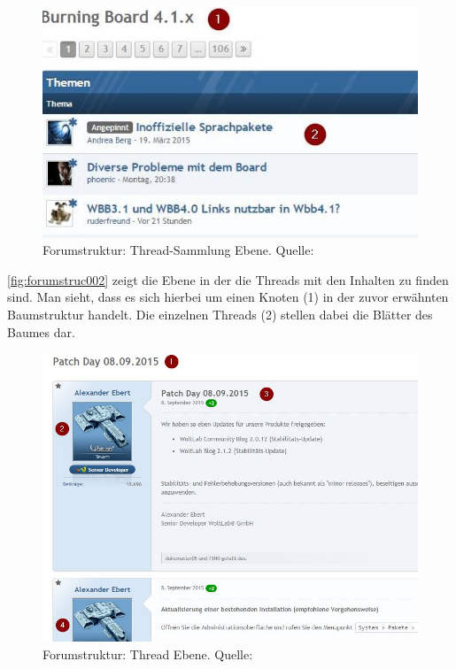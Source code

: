 \documentclass[a4paper]{article}
\begin{document}
	\begin{figure}[H] 
		\centerline{
			\includegraphics[scale=0.73]{../Bilder/forumstruc002.jpg}
		}
		\caption{Forumstruktur: Thread-Sammlung Ebene. Quelle: \cite{BB}}
		\label{fig:forumstruc002}
	\end{figure}	
	
	\autoref{fig:forumstruc002} zeigt die Ebene in der die Threads mit den
	Inhalten zu finden sind. Man sieht, dass es sich hierbei um einen Knoten (1)
	in der zuvor erwähnten Baumstruktur handelt. Die einzelnen Threads (2) stellen
	dabei die Blätter des Baumes dar.
		
	\begin{figure}[H] 
		\centerline{
			\includegraphics[scale=0.6]{../Bilder/forumstruc003.jpg}
		}
		\caption{Forumstruktur: Thread Ebene. Quelle: \cite{BB}}
		\label{fig:forumstruc003}
	\end{figure}	
	
\end{document}
